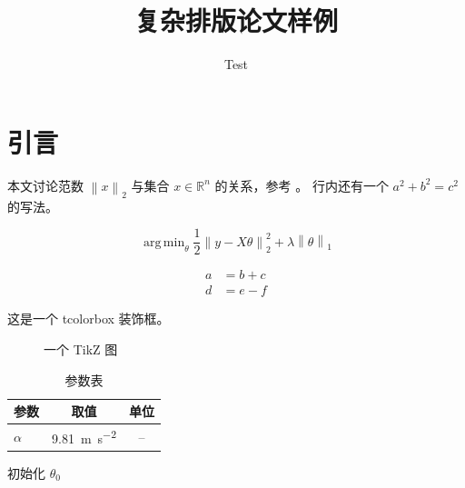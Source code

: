 \documentclass[11pt,twocolumn]{article}
\newcommand{\R}{\mathbb{R}}
\newcommand{\norm}[1]{\left\lVert #1 \right\rVert}
\DeclareMathOperator*{\argmin}{arg\,min}
\newenvironment{note}{\begin{tcolorbox}[colback=gray!5]}{\end{tcolorbox}}
\begin{document}
\title{复杂排版论文样例}
\author{Test}
\maketitle

\section{引言}
本文讨论范数 $\norm{x}_2$ 与集合 $x \in \R^n$ 的关系，参考 \cite{ref1}。
行内还有一个 \(a^2+b^2=c^2\) 的写法。



\begin{equation}
  \label{eq:main}
  \argmin_{\theta} \frac{1}{2}\norm{y - X\theta}_2^2 + \lambda \norm{\theta}_1
  \tag{1}
\end{equation}

\begin{align}
  a &= b + c \label{eq:a}\\
  d &= e - f \label{eq:b}
\end{align}

\begin{note}
这是一个 tcolorbox 装饰框。
\end{note}

\begin{figure}[h]
  \centering
  \caption{一个 TikZ 图}
\end{figure}

\begin{table}[h]
  \centering
  \begin{tabular}{lcc}
    \toprule
    参数 & 取值 & 单位 \\
    \midrule
    $\alpha$ & \SI{9.81}{\meter\per\second\squared} & -- \\
    \bottomrule
  \end{tabular}
  \caption{参数表}
\end{table}

\begin{algorithm2e}
  初始化 $\theta_0$ \;
\end{algorithm2e}



\end{document}
